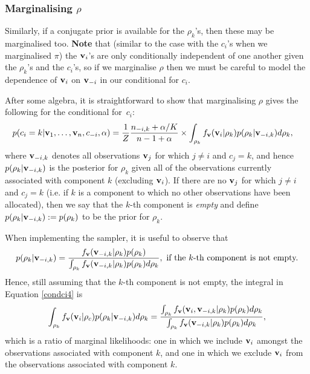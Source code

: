 \documentclass[fleqn,11pt]{wlscirep}
\begin{document}
\subsubsection{Marginalising $\rho$}
Similarly, if a conjugate prior is available for the $\rho_k$'s, then these may be marginalised too.  {\bf Note} that (similar to the case with the $c_i$'s when we marginalised $\pi$) the ${\bf v}_i$'s are only conditionally independent of one another given the $\rho_k$'s and the $c_i$'s, so if we marginalise $\rho$ then we must be careful to model the dependence of ${\bf v}_i$ on ${\bf v}_{-i}$ in our conditional for $c_i$.  

After some algebra, it is straightforward to show that marginalising $\rho$ gives the following for the conditional for~$c_i$:
\begin{align}
p(c_i = k| {\bf v}_1,\ldots, {\bf v}_n,c_{-i}, \alpha) &= \frac{1}{Z} \frac{n_{-i,k} + \alpha/K}{n - 1 + \alpha} \times \int_{\rho_k}f_{\bf v}({\bf v}_i | \rho_k) p(\rho_k|{\bf v}_{-i,k}) d\rho_k,\label{condci4}
\end{align} 
where ${\bf v}_{-i,k}$ denotes all observations ${\bf v}_j$ for which $j \ne i$ and $c_j = k$, and hence $p(\rho_k|{\bf v}_{-i,k})$ is the posterior for $\rho_k$ given all of the observations currently associated with component $k$ (excluding ${\bf v}_i$).  If there are no ${\bf v}_j$ for which $j \ne i$ and $c_j = k$ (i.e. if $k$ is a component to which no other observations have been allocated), then we say that the $k$-th component is {\em empty} and define $p(\rho_k|{\bf v}_{-i,k}):= p(\rho_k)$ to be the prior for $\rho_k$.  

When implementing the sampler, it is useful to observe that $$p(\rho_k|{\bf v}_{-i,k}) = \frac{f_{\bf v}({\bf v}_{-i,k}|\rho_k) p(\rho_k)}{\int_{\rho_k}f_{\bf v}({\bf v}_{-i,k}|\rho_k) p(\rho_k)d\rho_k}, \mbox{ if the $k$-th component is not empty.}$$  
Hence, still assuming that the $k$-th component is not empty, the integral in Equation \eqref{condci4} is
\begin{equation}
\int_{\rho_k}f_{\bf v}({\bf v}_i | \rho_c) p(\rho_k|{\bf v}_{-i,k}) d\rho_k = 
\frac{\int_{\rho_k}f_{\bf v}({\bf v}_i,{\bf v}_{-i,k}|\rho_k) p(\rho_k)d\rho_k}{\int_{\rho_k}f_{\bf v}({\bf v}_{-i,k}|\rho_k) p(\rho_k)d\rho_k},\label{marg}
\end{equation}
which is a ratio of marginal likelihoods: one in which we include ${\bf v}_i$ amongst the observations associated with component $k$, and one in which we exclude ${\bf v}_i$ from the observations associated with component $k$.  
\end{document}
